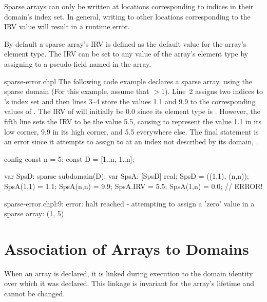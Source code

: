 Sparse arrays can only be written at locations corresponding to
indices in their domain's index set.  In general, writing to other
locations corresponding to the IRV value will result in a runtime
error.

By default a sparse array's IRV is defined as the default value for
the array's element type.  The IRV can be set to any value of the
array's element type by assigning to a pseudo-field named 
in the array.

\begin{chapelexample}{sparse-error.chpl}
The following code example declares a sparse array,  using
the sparse domain  (For this example, assume that
$>$1).  Line~2 assigns two indices to 's index set
and then lines 3--4 store the values 1.1 and 9.9 to the corresponding
values of .  The IRV of  will initially be 0.0
since its element type is .  However, the fifth line sets
the IRV to be the value 5.5, causing  to represent the
value 1.1 in its low corner, 9.9 in its high corner, and 5.5
everywhere else.  The final statement is an error since it attempts to
assign to  at an index not described by its domain,
.

\begin{chapelpre}
config const n = 5;
const D = [1..n, 1..n];
\end{chapelpre}
\begin{chapel}
var SpsD: sparse subdomain(D);
var SpsA: [SpsD] real;
SpsD = ((1,1), (n,n));
SpsA(1,1) = 1.1;
SpsA(n,n) = 9.9;
SpsA.IRV = 5.5;
SpsA(1,n) = 0.0;  // ERROR!
\end{chapel}
\begin{chapeloutput}
sparse-error.chpl:9: error: halt reached - attempting to assign a 'zero' value in a sparse array: (1, 5)
\end{chapeloutput}
\end{chapelexample}



\section{Association of Arrays to Domains}
\label{Association_of_Arrays_to_Domains}

%
%

When an array is declared, it is linked during execution to the domain
identity over which it was declared.  This linkage is invariant for
the array's lifetime and cannot be changed.

